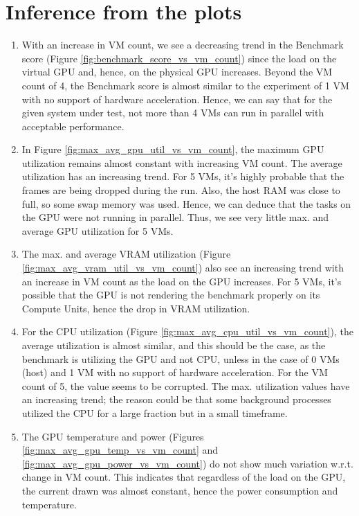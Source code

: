\documentclass[a4paper,12pt, final]{report}
\begin{document}
\section{Inference from the plots}
\begin{enumerate}
    \item With an increase in VM count, we see a decreasing trend in the Benchmark score (Figure \ref{fig:benchmark_score_vs_vm_count}) since the load on the virtual GPU and, hence, on the physical GPU increases. Beyond the VM count of 4, the Benchmark score is almost similar to the experiment of 1 VM with no support of hardware acceleration. Hence, we can say that for the given system under test, not more than 4 VMs can run in parallel with acceptable performance.
    \item In Figure \ref{fig:max_avg_gpu_util_vs_vm_count}, the maximum GPU utilization remains almost constant with increasing VM count. The average utilization has an increasing trend. For 5 VMs, it's highly probable that the frames are being dropped during the run. Also, the host RAM was close to full, so some swap memory was used. Hence, we can deduce that the tasks on the GPU were not running in parallel. Thus, we see very little max. and average GPU utilization for 5 VMs.
    \item The max. and average VRAM utilization (Figure \ref{fig:max_avg_vram_util_vs_vm_count}) also see an increasing trend with an increase in VM count as the load on the GPU increases. For 5 VMs, it's possible that the GPU is not rendering the benchmark properly on its Compute Units, hence the drop in VRAM utilization.
    \item For the CPU utilization (Figure \ref{fig:max_avg_cpu_util_vs_vm_count}), the average utilization is almost similar, and this should be the case, as the benchmark is utilizing the GPU and not CPU, unless in the case of 0 VMs (host) and 1 VM with no support of hardware acceleration. For the VM count of 5, the value seems to be corrupted. The max. utilization values have an increasing trend; the reason could be that some background processes utilized the CPU for a large fraction but in a small timeframe.
    \item The GPU temperature and power (Figures \ref{fig:max_avg_gpu_temp_vs_vm_count} and \ref{fig:max_avg_gpu_power_vs_vm_count}) do not show much variation w.r.t. change in VM count. This indicates that regardless of the load on the GPU, the current drawn was almost constant, hence the power consumption and temperature.
\end{enumerate}
\end{document}
